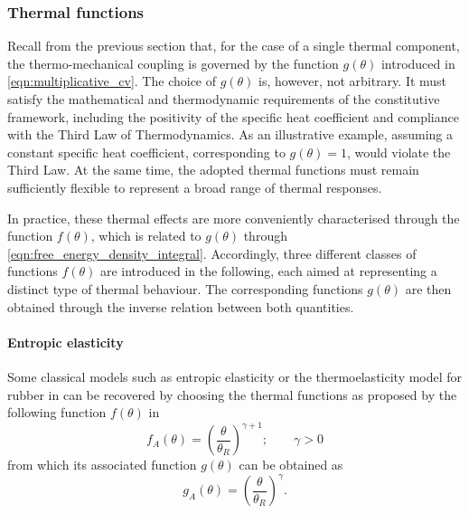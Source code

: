 \subsubsection{Thermal functions}


Recall from the previous section that, for the case of a single thermal
component, the thermo-mechanical coupling is governed by the function
$g(\theta)$ introduced in \eqref{eqn:multiplicative_cv}. 
The choice of $g(\theta)$ is, however, not arbitrary. It must satisfy
the mathematical and thermodynamic requirements of the constitutive
framework, including the positivity of the specific heat coefficient and
compliance with the Third Law of Thermodynamics. As an illustrative
example, assuming a constant specific heat coefficient, corresponding to
$g(\theta)=1$, would violate the Third Law. At the same time, the
adopted thermal functions must remain sufficiently flexible to represent
a broad range of thermal responses.

In practice, these thermal effects are more conveniently characterised
through the function $f(\theta)$, which is related to $g(\theta)$
through \eqref{eqn:free_energy_density_integral}. Accordingly, three
different classes of functions $f(\theta)$ are introduced in the
following, each aimed at representing a distinct type of thermal
behaviour. The corresponding functions $g(\theta)$ are then obtained
through the inverse relation between both quantities.
%




\paragraph{Entropic elasticity}
Some classical models such as entropic elasticity or the thermoelasticity model for rubber in \cite{treloar1975} can be recovered by choosing the thermal functions as proposed by the following function $f(\theta)$ in \cite{BonetGil2026}
\begin{equation}    \label{eqn:thermal_function_f_bonet}
    f_A(\theta) 
    = \left(\frac{\theta}{\theta_R}\right)^{\gamma+1};\qquad \gamma > 0
\end{equation}
%
from which its associated function $g(\theta)$ can be obtained as
%
\begin{equation}\label{eqn:thermal_function_g_bonet}	
    g_A(\theta) = \left(\frac{\theta}{\theta_R}\right)^{\gamma} . 
\end{equation}


